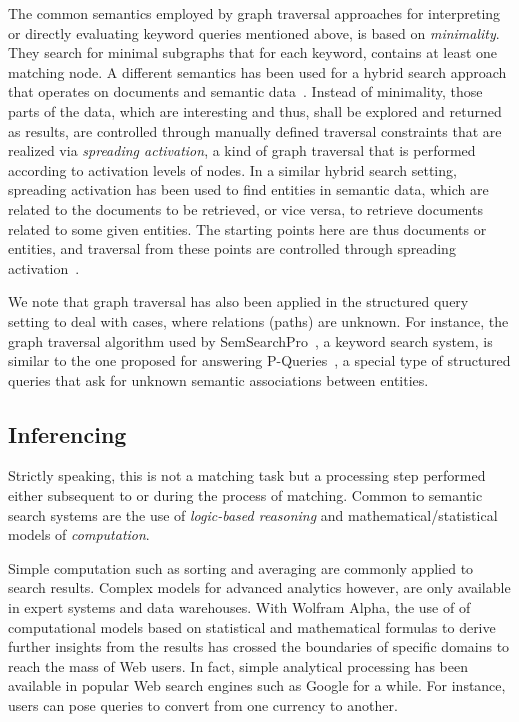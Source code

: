	The common semantics employed by graph traversal approaches for interpreting or directly evaluating keyword queries mentioned above, is based on \emph{minimality}. They search for minimal subgraphs that for each keyword, contains at least one matching node. A different semantics has been used for a hybrid search approach that operates on documents and semantic data~\cite{DBLP:conf/www/RochaSA04}. 
Instead of minimality, those parts of the data, which are interesting and thus, shall be explored and returned as results, are controlled through manually defined traversal constraints that are realized via \emph{spreading activation}, a kind of graph traversal that is performed according to activation levels of nodes. In a similar hybrid search setting, 
spreading activation has been used to find entities in semantic data, which are related to the documents to be retrieved, or vice versa, to retrieve documents related to some given entities. The starting points here are thus documents or entities, and traversal from these points are controlled through spreading activation~\cite{DBLP:conf/esws/SchumacherSS08}.

We note that graph traversal has also been applied in the structured query setting to deal with cases, where relations (paths) are unknown. For instance, the graph traversal algorithm used by SemSearchPro~\cite{DBLP:journals/ws/TranHL11,DBLP:conf/icde/TranWRC09}, a keyword search system, is similar to the one proposed for answering P-Queries~\cite{DBLP:conf/www/AnyanwuS03}, a special type of structured queries that ask for unknown semantic associations between entities. 


	\subsection{Inferencing} Strictly speaking, this is not a matching task but a processing step performed either subsequent to or during the process of matching. Common to semantic search systems are the use of \emph{logic-based reasoning} and mathematical/statistical models of \emph{computation}. 
	
	Simple computation such as sorting and averaging are commonly applied to search results. Complex models for advanced analytics however, are only available in expert systems and data warehouses. With Wolfram Alpha, the use of of computational models based on statistical and mathematical formulas to derive further insights from the results has crossed the boundaries of specific domains to reach the mass of Web users. In fact, simple analytical processing has been available in popular Web search engines such as Google for a while. For instance, users can pose queries to convert from one currency to another. 
	
